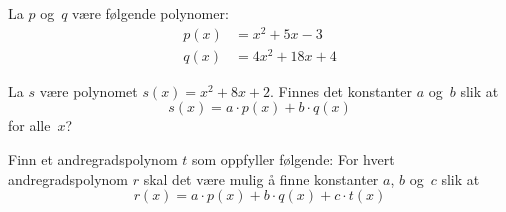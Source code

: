 \begin{oppgave}
La $p$ og~$q$ være følgende polynomer:
\begin{align*}
p(x) &= x^2 + 5x - 3 \\
q(x) &= 4x^2 + 18x + 4
\end{align*}
\begin{punkt}
La $s$ være polynomet $s(x) = x^2 + 8x + 2$.  Finnes det konstanter
$a$ og~$b$ slik at
\[
s(x) = a \cdot p(x) + b \cdot q(x)
\]
for alle~$x$?
\end{punkt}
\begin{punkt}
Finn et andregradspolynom $t$ som oppfyller følgende: For hvert
andregradspolynom $r$ skal det være mulig å finne konstanter $a$, $b$
og~$c$ slik at
\[
r(x) = a \cdot p(x) + b \cdot q(x) + c \cdot t(x)
\]
\end{punkt}
\end{oppgave}
